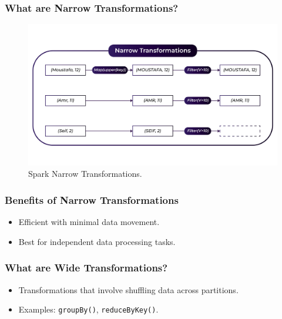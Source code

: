 \begin{frame}
    \frametitle{What are Narrow Transformations?}
    \begin{figure}
        \includegraphics[width=\textwidth,height=.75\textheight,keepaspectratio]{./Figures/chapter-04/Narrow}
        \caption{Spark Narrow Transformations.}\label{fig:spark_narrow}
    \end{figure}
\end{frame}

\begin{frame}
    \frametitle{Benefits of Narrow Transformations}
    \begin{itemize}
        \item Efficient with minimal data movement.
        \item Best for independent data processing tasks.
    \end{itemize}
\end{frame}

\begin{frame}
    \frametitle{What are Wide Transformations?}
    \begin{itemize}
        \item Transformations that involve shuffling data across partitions.
        \item Examples: \texttt{groupBy()}, \texttt{reduceByKey()}.
    \end{itemize}
\end{frame}

